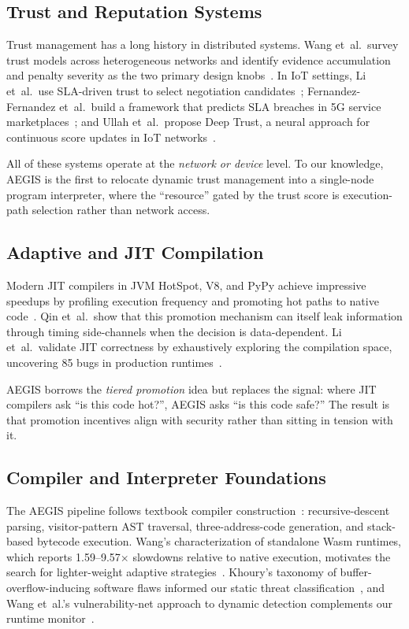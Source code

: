 \documentclass[conference]{IEEEtran}
\begin{document}
\subsection{Trust and Reputation Systems}

Trust management has a long history in distributed systems.
Wang et~al.\ survey trust models across heterogeneous networks
and identify evidence accumulation and penalty severity as
the two primary design knobs~\cite{wang2022trust}.  In IoT
settings, Li et~al.\ use SLA-driven trust to select
negotiation candidates~\cite{li2022iot_trust};
Fernandez-Fernandez et~al.\ build a framework that predicts
SLA breaches in 5G service
marketplaces~\cite{fernandez2024sla}; and Ullah et~al.\
propose Deep Trust, a neural approach for continuous score
updates in IoT networks~\cite{ullah2024deeptrust}.

All of these systems operate at the \emph{network or device}
level.  To our knowledge, AEGIS is the first to relocate
dynamic trust management into a single-node program
interpreter, where the ``resource'' gated by the trust score
is execution-path selection rather than network access.

\subsection{Adaptive and JIT Compilation}

Modern JIT compilers in JVM HotSpot, V8, and PyPy achieve
impressive speedups by profiling execution frequency and
promoting hot paths to native
code~\cite{qin2022jit_security}.  Qin et~al.\ show that
this promotion mechanism can itself leak information
through timing side-channels when the decision is
data-dependent.  Li et~al.\ validate JIT correctness by
exhaustively exploring the compilation space,
uncovering 85 bugs in production
runtimes~\cite{chen2024jit_val}.

AEGIS borrows the \emph{tiered promotion} idea but
replaces the signal: where JIT compilers ask ``is this code
hot?'', AEGIS asks ``is this code safe?''  The result is
that promotion incentives align with security rather than
sitting in tension with it.

\subsection{Compiler and Interpreter Foundations}

The AEGIS pipeline follows textbook compiler
construction~\cite{aho2007compilers}: recursive-descent
parsing, visitor-pattern AST traversal, three-address-code
generation, and stack-based bytecode execution.  Wang's
characterization of standalone Wasm runtimes, which reports
1.59--9.57$\times$ slowdowns relative to native execution,
motivates the search for lighter-weight adaptive
strategies~\cite{tang2023wasm_runtimes}.  Khoury's taxonomy
of buffer-overflow-inducing software flaws informed our
static threat classification~\cite{khoury2022buffer}, and
Wang et~al.'s vulnerability-net approach to dynamic
detection complements our runtime
monitor~\cite{wang2022vulnets}.
\end{document}
